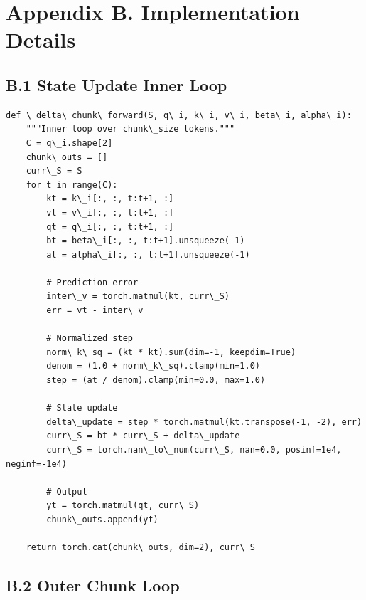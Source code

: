 
\section{Appendix B. Implementation Details}

\subsection{B.1 State Update Inner Loop}

\begin{lstlisting}
def \_delta\_chunk\_forward(S, q\_i, k\_i, v\_i, beta\_i, alpha\_i):
    """Inner loop over chunk\_size tokens."""
    C = q\_i.shape[2]
    chunk\_outs = []
    curr\_S = S
    for t in range(C):
        kt = k\_i[:, :, t:t+1, :]
        vt = v\_i[:, :, t:t+1, :]
        qt = q\_i[:, :, t:t+1, :]
        bt = beta\_i[:, :, t:t+1].unsqueeze(-1)
        at = alpha\_i[:, :, t:t+1].unsqueeze(-1)
        
        # Prediction error
        inter\_v = torch.matmul(kt, curr\_S)
        err = vt - inter\_v
        
        # Normalized step
        norm\_k\_sq = (kt * kt).sum(dim=-1, keepdim=True)
        denom = (1.0 + norm\_k\_sq).clamp(min=1.0)
        step = (at / denom).clamp(min=0.0, max=1.0)
        
        # State update
        delta\_update = step * torch.matmul(kt.transpose(-1, -2), err)
        curr\_S = bt * curr\_S + delta\_update
        curr\_S = torch.nan\_to\_num(curr\_S, nan=0.0, posinf=1e4, neginf=-1e4)
        
        # Output
        yt = torch.matmul(qt, curr\_S)
        chunk\_outs.append(yt)
    
    return torch.cat(chunk\_outs, dim=2), curr\_S
\end{lstlisting}

\subsection{B.2 Outer Chunk Loop}

